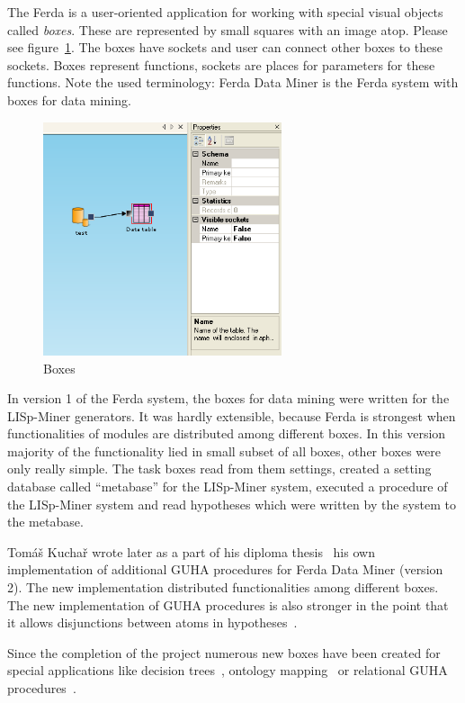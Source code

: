 \documentclass[a4paper,12pt]{book}
\begin{document}
The Ferda is a user-oriented application for working with special visual objects called \emph{boxes}. These are represented by small squares with an image atop. Please see figure~\ref{fig:boxes}. The boxes have sockets and user can connect other boxes to these sockets. Boxes represent functions, sockets are places for parameters for these functions. Note the used terminology: Ferda Data Miner is the Ferda system with boxes for data mining.

\begin{figure}
	\centering
	\includegraphics[width=7cm]{boxes}
	\caption{Boxes}
	\label{fig:boxes}
\end{figure}

In version 1 of the Ferda system, the boxes for data mining were written for the LISp-Miner generators. It was hardly extensible, because Ferda is strongest when functionalities of modules are distributed among different boxes. In this version majority of the functionality lied in small subset of all boxes, other boxes were only really simple. The task boxes read from them settings, created a setting database called ``metabase'' for the LISp-Miner system, executed a procedure of the LISp-Miner system and read hypotheses which were written by the system to the metabase.

Tomáš Kuchař wrote later as a part of his diploma thesis~\cite{thesisKuchar} his own implementation of additional GUHA procedures for Ferda Data Miner (version 2). The new implementation distributed functionalities among different boxes. The new implementation of GUHA procedures is also stronger in the point that it allows disjunctions between atoms in hypotheses~\cite{RalbovskyDisjunction}.

Since the completion of the project numerous new boxes have been created for special applications like decision trees~\cite{GUHAtrees}, ontology mapping~\cite{thesisZeman,thesisRalbovsky} or relational GUHA procedures~\cite{thesisKuzmin}. 
\end{document}
